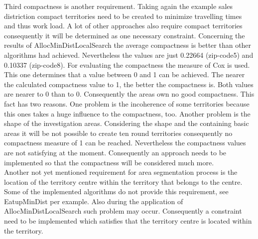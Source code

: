 Third compactness is another requirement. Taking again the example sales distriction compact territories need to be created to minimize travelling times and thus work load. A lot of other approaches also require compact territories consequently it will be determined as one necessary constraint. Concerning the results of AllocMinDistLocalSearch the average compactness is better than other algorithms had achieved. Nevertheless the values are just 0.22664 (zip-code5) and 0.10337 (zip-code8). For evaluating the compactness the measure of Cox is used. This one determines that a value between 0 and 1 can be achieved. The nearer the calculated compactness value to 1, the better the compactness is. Both values are nearer to 0 than to 0. Consequently the areas own no good compactness. This fact has two reasons. One problem is the incoherence of some territories because this ones takes a huge influence to the compactness, too. Another problem is the shape of the investigation areas. Considering the shape and the containing basic areas it will be not possible to create ten round territories consequently no compactness measure of 1 can be reached. Nevertheless the compactness values are not satisfying at the moment. Consequently an approach needs to be implemented so that the compactness will be considered much more. \\
Another not yet mentioned requirement for area segmentation process is the location of the territory centre within the territory that belongs to the centre. Some of the implemented algorithms do not provide this requirement, see EatupMinDist per example. Also during the application of AllocMinDistLocalSearch such problem may occur. Consequently a constraint need to be implemented which satisfies that the territory centre is located within the territory.

